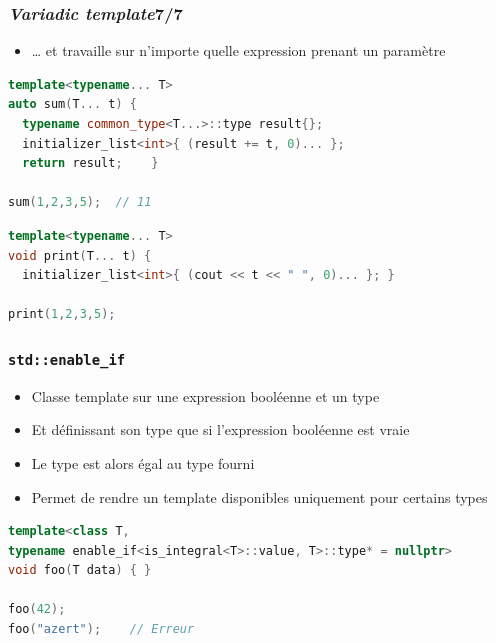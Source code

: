 \documentclass[C++.tex]{subfiles}
\begin{document}
\begin{frame}[fragile]
	\frametitle{\textit{Variadic template}\titlehfill{}7/7}
	\begin{itemize}
		\item \ldots{} et travaille sur n'importe quelle expression prenant un paramètre

	\end{itemize}

	\begin{lstlisting}[language=C++]
template<typename... T>
auto sum(T... t) {
  typename common_type<T...>::type result{};
  initializer_list<int>{ (result += t, 0)... };
  return result; 	}

sum(1,2,3,5);  // 11\end{lstlisting}

	\begin{lstlisting}[language=C++]
template<typename... T>
void print(T... t) {
  initializer_list<int>{ (cout << t << " ", 0)... }; }

print(1,2,3,5);\end{lstlisting}
\end{frame}

\begin{frame}[fragile]
	\frametitle{\lstinline|std::enable_if|}
	\begin{itemize}
		\item Classe template sur une expression booléenne et un type
		\item Et définissant son type que si l'expression booléenne est vraie
		\item Le type est alors égal au type fourni
		\item Permet de rendre un template disponibles uniquement pour certains types
	\end{itemize}

	\begin{lstlisting}[language=C++]
template<class T, 
typename enable_if<is_integral<T>::value, T>::type* = nullptr>
void foo(T data) { }

foo(42);
foo("azert");    // Erreur\end{lstlisting}
\end{frame}
\end{document}
